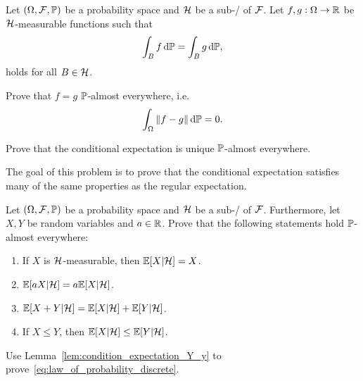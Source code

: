 \begin{problem}
Let $(\Omega, \mathcal F, \mathbb P)$ be a probability space and $\mathcal H$ be a sub-\sigalg/ of $\mathcal F$. Let $f, g : \Omega \to \mathbb R$ be $\mathcal H$-measurable functions such that
\[
	\int_B f \, \mathrm{d} \mathbb P = \int_B g \, \mathrm{d} \mathbb P,
\]
holds for all $B \in \mathcal H$. 

Prove that $f=g$ $\mathbb P$-almost everywhere, i.e.
\[
	\int_\Omega \|f - g\| \, \mathrm{d} \mathbb P = 0.
\]
\end{problem}

\begin{problem}
Prove that the conditional expectation is unique $\mathbb P$-almost everywhere.
\end{problem}

\begin{problem}
The goal of this problem is to prove that the conditional expectation satisfies many of the same properties as the regular expectation. 

Let $(\Omega, \mathcal F, \mathbb P)$ be a probability space and $\mathcal H$ be a sub-\sigalg/ of $\mathcal F$. Furthermore, let $X, Y$ be random variables and $a \in \mathbb R$. Prove that the following statements hold $\mathbb P$-almost everywhere:
\begin{enumerate}[label={(\alph*)}]
\item If $X$ is $\mathcal H$-measurable, then $\mathbb E[X | \mathcal H] = X$.
\item $\mathbb E[a X | \mathcal H] = a \mathbb E[X | \mathcal H]$.
\item $\mathbb E[X + Y | \mathcal H] = \mathbb E[X | \mathcal H] + \mathbb E[Y | \mathcal H]$.
\item If $X \le Y$, then $\mathbb E[X | \mathcal H] \le \mathbb E[Y | \mathcal H]$.
\end{enumerate}
\end{problem}

\begin{problem}\label{prb:law_of_probability_discrete}
Use Lemma~\ref{lem:condition_expectation_Y_y} to prove~\eqref{eq:law_of_probability_discrete}.
\end{problem}
